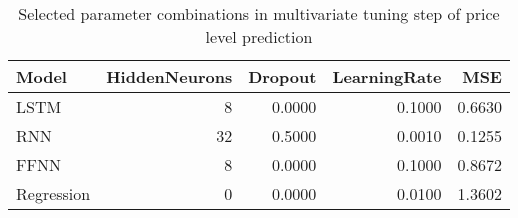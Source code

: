 \begin{table}[h!]
\centering
 \begin{adjustbox}{max width=\textwidth}
\begin{tabular}{lrrrr}
  \hline
Model & HiddenNeurons & Dropout & LearningRate & MSE \\ 
  \hline
LSTM &     8 & 0.0000 & 0.1000 & 0.6630 \\ 
  RNN &    32 & 0.5000 & 0.0010 & 0.1255 \\ 
  FFNN &     8 & 0.0000 & 0.1000 & 0.8672 \\ 
  Regression &     0 & 0.0000 & 0.0100 & 1.3602 \\ 
   \hline
 \end{tabular}
\end{adjustbox}
\caption{Selected parameter combinations in multivariate tuning step of price level prediction} 
\label{tab:level.multivar.par.tuning.short}
\end{table}

